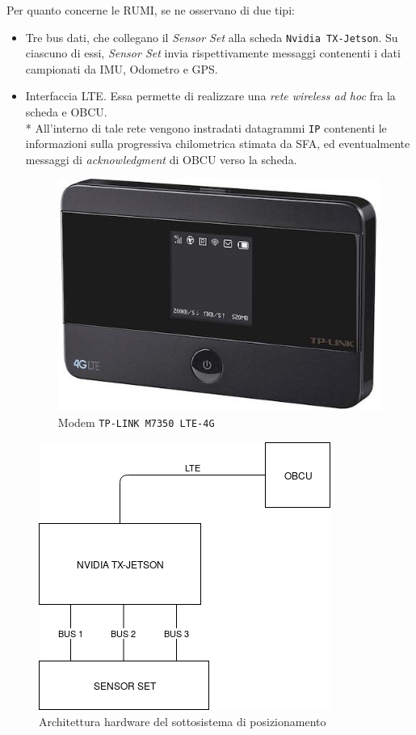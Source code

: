 	Per quanto concerne le RUMI, se ne osservano di due tipi:
	\begin{itemize}
		\item Tre bus dati, che collegano il \emph{Sensor Set} alla scheda \texttt{Nvidia TX-Jetson}. Su ciascuno di essi, \emph{Sensor Set} invia rispettivamente messaggi contenenti i dati campionati da IMU, Odometro e GPS.
		\item Interfaccia LTE. Essa permette di realizzare una \emph{rete wireless ad hoc} fra la scheda e OBCU.\\*
		All'interno di tale rete vengono instradati datagrammi \texttt{IP} contenenti le informazioni sulla progressiva chilometrica stimata da SFA, ed eventualmente messaggi di \emph{acknowledgment} di OBCU verso la scheda.
		\begin{figure}[h]
			\centering
			\includegraphics[scale=0.40]{img/lte}
			\caption{Modem \texttt{TP-LINK M7350 LTE-4G}}
			\label{fig:lte}
		\end{figure}
	\end{itemize}
	\begin{figure}[h]
		\centering
		\includegraphics[width=0.7\linewidth]{img/TrainDiagram}
		\caption{Architettura hardware del sottosistema di posizionamento}
		\label{fig:tdiagram}
	\end{figure}
